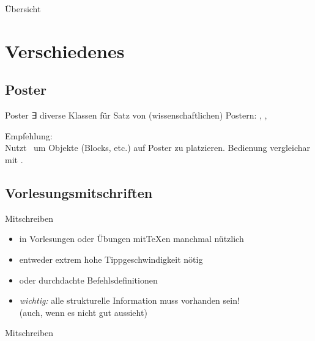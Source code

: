 \documentclass[
	vorläufig=false,
	datum=2017-01-26,
	titel={Komplexe Makros und Befehle},
	web=true,
	mo,
	aspectratio=1610,
]{../tex/latexkurs-slides}
\begin{document}
\begin{frame}{Übersicht}
	\tableofcontents
\end{frame}


\section{Verschiedenes}
\subsection{Poster}
\begin{frame}{Poster}
%
∃ diverse Klassen für Satz von (wissenschaftlichen) Postern: , , \\[1ex]\pause

Empfehlung: \\[1ex]

Nutzt	 \TikZ\ um Objekte (Blocks, etc.) auf Poster zu platzieren. Bedienung vergleichar mit .
\end{frame}

\subsection{Vorlesungsmitschriften}

\begin{frame}{Mitschreiben}
\begin{itemize}
	\item in Vorlesungen oder Übungen mit\TeX{}en manchmal nützlich
	\item entweder extrem hohe Tippgeschwindigkeit nötig
	\item oder durchdachte Befehlsdefinitionen
	\item \emph{wichtig:} alle strukturelle Information muss vorhanden sein!\\%
(auch, wenn es nicht gut aussieht)
\end{itemize} 
\end{frame}

\begin{frame}[fragile]{Mitschreiben}
\end{frame}
\end{document}
